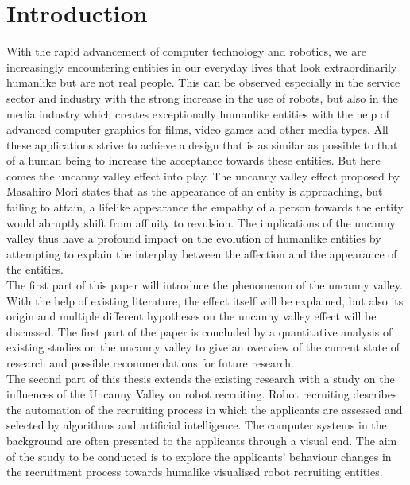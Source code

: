 \chapter{Introduction}
With the rapid advancement of computer technology and robotics, we are increasingly encountering entities in our everyday lives that look extraordinarily humanlike but are not real people. This can be observed especially in the service sector and industry with the strong increase in the use of robots, but also in the media industry which creates exceptionally humanlike entities with the help of advanced computer graphics for films, video games and other media types. All these applications strive to achieve a design that is as similar as possible to that of a human being to increase the acceptance towards these entities. But here comes the uncanny valley effect into play. The uncanny valley effect proposed by Masahiro Mori \cite{original_masahiro} states that as the appearance of an entity is approaching, but failing to attain, a lifelike appearance the empathy of a person towards the entity would abruptly shift from affinity to revulsion. The implications of the uncanny valley thus have a profound impact on the evolution of humanlike entities by attempting to explain the interplay between the affection and the appearance of the entities.\\
The first part of this paper will introduce the phenomenon of the uncanny valley. With the help of existing literature, the effect itself will be explained, but also its origin and multiple different hypotheses on the uncanny valley effect will be discussed. The first part of the paper is concluded by a quantitative analysis of existing studies on the uncanny valley to give an overview of the current state of research and possible recommendations for future research.\\
The second part of this thesis extends the existing research with a study on the influences of the Uncanny Valley on robot recruiting. Robot recruiting describes the automation of the recruiting process in which the applicants are assessed and selected by algorithms and artificial intelligence. The computer systems in the background are often presented to the applicants through a visual end. The aim of the study to be conducted is to explore the applicants’ behaviour changes in the recruitment process  towards humalike visualised robot recruiting entities. 